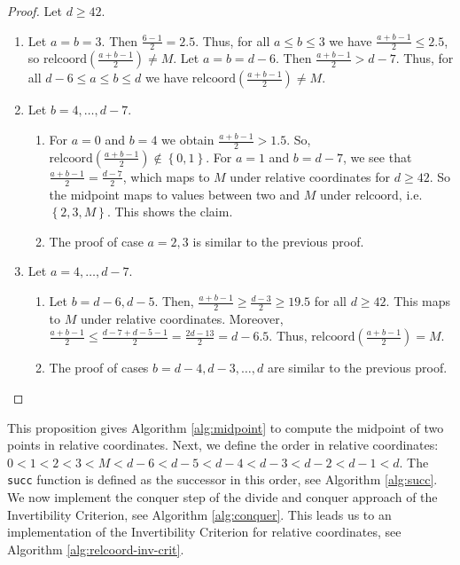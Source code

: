 \begin{proof}
    Let \( d \geq 42 \).
    \begin{enumerate}
        \item Let \( a = b = 3 \). Then \( \frac{6 - 1 }{2} = 2.5 \). Thus, for all \( a \leq b \leq 3 \) we have \( \frac{a + b - 1 }{2} \leq 2.5 \), so \(\mathrm{relcoord}( \frac{a + b - 1 }{2})  \neq M \). Let \( a = b = d - 6 \). Then \( \frac{a + b -1}{2} > d - 7 \). Thus, for all \( d-6 \leq a \leq b \leq d \) we have \( \mathrm{relcoord}(\frac{a + b - 1 }{2}) \neq M \).
        \item Let \( b = 4, \dots, d-7 \).
        \begin{enumerate}
            \item For \( a = 0 \) and \( b  = 4 \) we obtain \( \frac{a + b -1}{2} > 1.5 \). So, \( \mathrm{relcoord}(\frac{a + b - 1}{2})  \notin \left\{ 0,1 \right\} \). For \( a = 1 \) and \( b  = d-7 \), we see that \( \frac{a + b -1}{2} = \frac{d-7}{2} \), which maps to \( M \) under relative coordinates for \( d \geq 42 \). So the midpoint maps to values between two and \( M \) under \( \mathrm{relcoord} \), i.e. \( \left\{ 2,3,M \right\} \). This shows the claim.
            \item The proof of case \( a = 2,3 \) is similar to the previous proof.
        \end{enumerate}
        \item Let \( a = 4, \dots, d-7 \).
        \begin{enumerate}
            \item Let \( b = d-6, d-5 \). Then, \( \frac{a + b - 1}{2} \geq \frac{d - 3}{2} \geq 19.5 \) for all \( d \geq 42 \). This maps to \( M \) under relative coordinates. Moreover,  \( \frac{a + b - 1}{2} \leq \frac{d - 7 + d - 5 - 1}{2} = \frac{2d - 13}{2} = d - 6.5 \). Thus, 
            \( \mathrm{relcoord}(\frac{a + b - 1}{2}) = M \).
            \item The proof of cases \( b = d-4, d-3, \dots, d \) are similar to the previous proof.
        \end{enumerate}
    \end{enumerate}
\end{proof}

This proposition gives Algorithm \ref{alg:midpoint} to compute the midpoint of two points in relative coordinates. Next, we define the order in relative coordinates: \(     0 < 1 < 2 < 3 < M < d-6 < d-5 < d-4 < d-3 < d-2 < d-1 < d\).
The \texttt{succ} function is defined as the successor in this order, see Algorithm \ref{alg:succ}. We now implement the conquer step of the divide and conquer approach of the Invertibility Criterion, see Algorithm \ref{alg:conquer}. This leads us to an implementation of the Invertibility Criterion for relative coordinates, see Algorithm \ref{alg:relcoord-inv-crit}.

